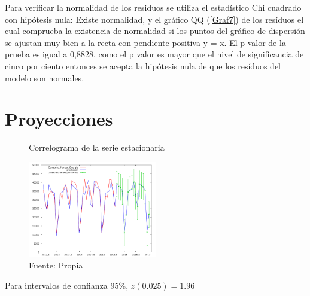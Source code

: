 \documentclass[12pt,letterpaper]{report}
\begin{document}
Para verificar la normalidad de los residuos se utiliza el estadístico Chi
cuadrado con hipótesis nula: Existe normalidad, y el gráfico QQ (\ref{Graf7}) de los
resíduos  el cual comprueba la existencia de normalidad si los puntos del
gráfico de dispersión se ajustan muy bien a la recta con pendiente positiva y = x. El p valor de la prueba es igual a
0,8828, como el p valor es mayor que el nivel de significancia de cinco por
ciento entonces se acepta la hipótesis nula de que los resíduos del modelo son
normales.

\section{Proyecciones}


\begin{figure}[htb]

\centering
\caption{Correlograma de la serie estacionaria} 
\includegraphics [width=0.5\textwidth]{Proyecciones}
\caption*{Fuente: Propia} \label{Graf8}

\end{figure}

\begin{center}
 Para intervalos de confianza 95\%, $z(0.025) = 1.96$

\end{center}
\end{document}
